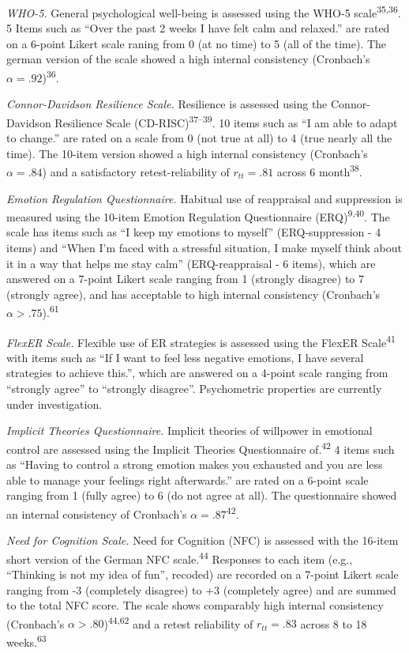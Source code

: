 \documentclass[
  english,
  man,floatsintext]{apa6}
\begin{document}
\emph{WHO-5.}
General psychological well-being is assessed using the WHO-5 scale\textsuperscript{35,36}.
5 Items such as ``Over the past 2 weeks I have felt calm and relaxed.'' are rated on a 6-point Likert scale raning from 0 (at no time) to 5 (all of the time).
The german version of the scale showed a high internal consistency (Cronbach's \(\alpha=.92\))\textsuperscript{36}.

\emph{Connor-Davidson Resilience Scale.}
Resilience is assessed using the Connor-Davidson Resilience Scale (CD-RISC)\textsuperscript{37--39}.
10 items such as ``I am able to adapt to change.'' are rated on a scale from 0 (not true at all) to 4 (true nearly all the time).
The 10-item version showed a high internal consistency (Cronbach's \(\alpha=.84\)) and a satisfactory retest-reliability of \(r_{tt}=.81\) across 6 month\textsuperscript{38}.

\emph{Emotion Regulation Questionnaire.}
Habitual use of reappraisal and suppression is measured using the 10-item Emotion Regulation Questionnaire (ERQ)\textsuperscript{9,40}.
The scale has items such as ``I keep my emotions to myself'' (ERQ-suppression - 4 items) and ``When I'm faced with a stressful situation, I make myself think about it in a way that helps me stay calm'' (ERQ-reappraisal - 6 items), which are answered on a 7-point Likert scale ranging from 1 (strongly disagree) to 7 (strongly agree), and has acceptable to high internal consistency (Cronbach's \(\alpha>.75\)).\textsuperscript{61}

\emph{FlexER Scale.}
Flexible use of ER strategies is assessed using the FlexER Scale\textsuperscript{41} with items such as ``If I want to feel less negative emotions, I have several strategies to achieve this.'', which are answered on a 4-point scale ranging from ``strongly agree'' to ``strongly disagree''.
Psychometric properties are currently under investigation.

\emph{Implicit Theories Questionnaire.}
Implicit theories of willpower in emotional control are assessed using the Implicit Theories Questionnaire of.\textsuperscript{42}
4 items such as ``Having to control a strong emotion makes you exhausted and you are less able to manage your feelings right afterwards.'' are rated on a 6-point scale ranging from 1 (fully agree) to 6 (do not agree at all).
The questionnaire showed an internal consistency of Cronbach's \(\alpha=.87\)\textsuperscript{42}.

\emph{Need for Cognition Scale.}
Need for Cognition (NFC) is assessed with the 16-item short version of the German NFC scale.\textsuperscript{44}
Responses to each item (e.g., ``Thinking is not my idea of fun'', recoded) are recorded on a 7-point Likert scale ranging from -3 (completely disagree) to +3 (completely agree) and are summed to the total NFC score.
The scale shows comparably high internal consistency (Cronbach's \(\alpha>.80\))\textsuperscript{44,62} and a retest reliability of \(r_{tt}=.83\) across 8 to 18 weeks.\textsuperscript{63}
\end{document}

